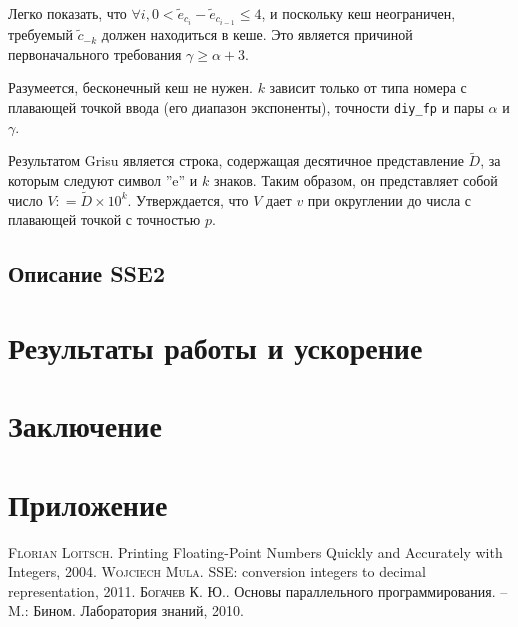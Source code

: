 \documentclass[a4paper, 12pt, twoside]{article}
\begin{document}
Легко показать, что $\forall i, 0 < \tilde{e}_{c_i} - \tilde{e}_{c_{i-1}} \leqslant 4$, и поскольку кеш неограничен, требуемый $\tilde{c}_{-k}$ должен находиться в кеше. 
Это является причиной первоначального требования $\gamma \geqslant \alpha + 3$.

Разумеется, бесконечный кеш не нужен. 
$k$ зависит только от типа номера с плавающей точкой ввода (его диапазон экспоненты), точности \texttt{diy\_fp} и пары $\alpha$ и $\gamma$.

Результатом \textsf{Grisu} является строка, содержащая десятичное представление $\tilde{D}$, за которым следуют символ ''e'' и $k$ знаков. 
Таким образом, он представляет собой число $V: = \tilde{D} \times 10^k$. 
Утверждается, что $V$ дает $v$ при округлении до числа с плавающей точкой с точностью $p$.



\subsection{Описание \textsf{SSE2}}



\section{Результаты работы и ускорение}

\section{Заключение}


\newpage

\appendix
\section*{Приложение}
\renewcommand{\thesubsection}{(\Alph{subsection})}

\newpage
\begin{thebibliography}{}

 \textsc{Florian Loitsch}.
Printing Floating-Point Numbers Quickly and Accurately with Integers, 2004.
 \textsc{Wojciech Mula}.
SSE: conversion integers to decimal representation, 2011.
 \textsc{Богачев К. Ю.}. 
Основы параллельного программирования. -- M.: Бином. Лаборатория знаний, 2010.


\end{thebibliography}
\end{document}
